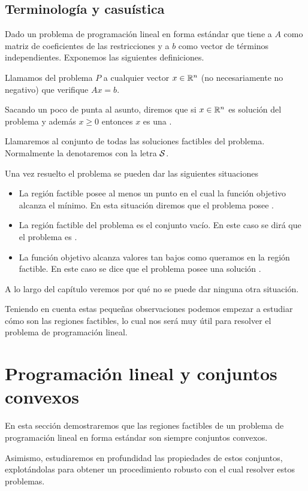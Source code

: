 \subsection{Terminología y casuística}
Dado un problema de programación lineal en forma estándar que tiene a $A$ como matriz de coeficientes de las restricciones y a $b$ como vector de términos independientes. Exponemos las siguientes definiciones.
\begin{defi}[Soluciones]
	Llamamos  del problema $P$ a cualquier vector $x\in\mathbb{R}^n$ (no necesariamente no negativo) que verifique $Ax=b$.
	
	Sacando un poco de punta al asunto, diremos que si $x\in\mathbb{R}^n$ es solución del problema y además $x\geq 0$ entonces $x$ es una .
	
	Llamaremos  al conjunto de todas las soluciones factibles del problema. Normalmente la denotaremos con la letra $\mathcal{S}$.
\end{defi}
Una vez resuelto el problema se pueden dar las siguientes situaciones
\begin{itemize}
	\item La región factible posee al menos un punto en el cual la función objetivo alcanza el mínimo. En esta situación diremos que el problema posee .
	\item La región factible del problema es el conjunto vacío. En este caso se dirá que el problema es .
	\item La función objetivo alcanza valores tan bajos como queramos en la región factible. En este caso se dice que el problema posee una solución .
\end{itemize}
A lo largo del capítulo veremos por qué no se puede dar ninguna otra situación.

Teniendo en cuenta estas pequeñas observaciones podemos empezar a estudiar cómo son las regiones factibles, lo cual nos será muy útil para resolver el problema de programación lineal.
\section{Programación lineal y conjuntos convexos}
En esta sección demostraremos que las regiones factibles de un problema de programación lineal en forma estándar son siempre conjuntos convexos. 

Asimismo, estudiaremos en profundidad las propiedades de estos conjuntos, explotándolas para obtener un procedimiento robusto con el cual resolver estos problemas.
